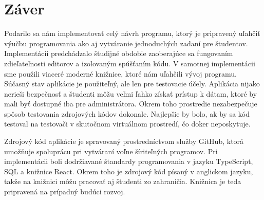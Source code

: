 \chapter*{Záver}  %

Podarilo sa nám implementovať celý návrh programu, ktorý je pripravený uľahčiť výučbu programovania
ako aj vytváranie jednoduchých zadaní pre študentov. Implementácii predchádzalo študijné obdobie
zaoberajúce sa fungovaním zdieľateľnosti editorov a izolovaným spúšťaním kódu. V samotnej
implementácii sme použili viaceré moderné knižnice, ktoré nám uľahčili vývoj programu. Súčasný stav
aplikácie je použiteľný, ale len pre testovacie účely. Aplikácia nijako nerieši bezpečnosť a študenti
môžu veľmi ľahko získať prístup k dátam, ktoré by mali byť dostupné iba pre administrátora. Okrem
toho prostredie nezabezpečuje spôsob testovania zdrojových kódov dokonale. Najlepšie by bolo, ak by
sa kód testoval na testovači v skutočnom virtuálnom prostredí, čo doker neposkytuje.

Zdrojový kód aplikácie je spravovaný prostredníctvom služby GitHub, ktorá umožňuje spoluprácu pri
vytváraní voľne šíriteľných programov. Pri implementácii boli dodržiavané štandardy programovania v
jazyku TypeScript, SQL a knižnice React. Okrem toho je zdrojový kód písaný v anglickom jazyku, takže
na knižnici môžu pracovať aj študenti zo zahraničia. Knižnica je teda pripravená na prípadný budúci
rozvoj.
